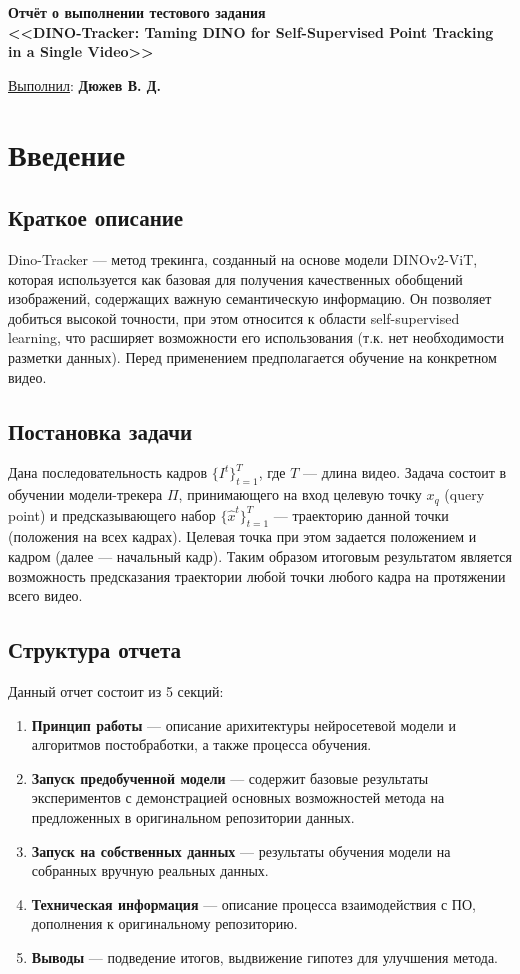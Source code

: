 \documentclass[a4paper, 14pt]{extarticle}
\theoremstyle{definition}
\theoremstyle{plain}
\theoremstyle{remark}
\newcommand*{\titlePage}{
	\thispagestyle{title}
	\begingroup
	\begin{center}
		\vspace*{3ex}
		{\small
		}
		
		\vspace*{2ex}
		
		{\normalsize
		}
		
		\vspace*{30ex}
		
		{\Large \bfseries 
			Отчёт о выполнении тестового задания\\
			{\large <<DINO-Tracker: Taming DINO for Self-Supervised
			Point Tracking in a Single Video>>\\
				}
			
		}
		
	\end{center}
	\vspace*{10ex}
	\begin{flushright}
		{\large 
			\underline{Выполнил}: \textbf{Дюжев В. Д.}
		}

	\end{flushright}	
	\newpage
	\setcounter{page}{1}
	\endgroup}
\begin{document}
\renewcommand{\contentsname}{\hfillОГЛАВЛЕНИЕ\hfill} 
\titlePage
\thispagestyle{plain}
\tableofcontents
\pagestyle{style}

\newpage
\setcounter{page}{1}


\section{Введение}
\subsection{Краткое описание}
Dino-Tracker --- метод трекинга, созданный на основе модели DINOv2-ViT, которая используется как базовая для получения качественных обобщений изображений, содержащих важную семантическую информацию. Он позволяет добиться высокой точности, при этом относится к области self-supervised learning, что расширяет возможности его использования (т.к. нет необходимости разметки данных). Перед применением предполагается обучение на конкретном видео.

\subsection{Постановка задачи}
Дана последовательность кадров $\{I^t\}^T_{t=1}$, где $T$ --- длина видео. Задача состоит в обучении модели-трекера $\Pi$, принимающего на вход целевую точку $x_q$ (query point) и предсказывающего набор $\{\hat{x}^t\}^T_{t=1}$ --- траекторию данной точки (положения на всех кадрах). Целевая точка при этом задается положением и кадром (далее --- начальный кадр).
Таким образом итоговым результатом является возможность предсказания траектории любой точки любого кадра на протяжении всего видео.

\subsection{Структура отчета}
Данный отчет состоит из 5 секций:
\begin{enumerate}
	\item \textbf{Принцип работы} --- описание арихитектуры нейросетевой модели и алгоритмов постобработки, а также процесса обучения.
	\item \textbf{Запуск предобученной модели} --- содержит базовые результаты экспериментов с демонстрацией основных возможностей метода на предложенных в оригинальном репозитории данных.
	\item \textbf{Запуск на собственных данных} --- результаты обучения модели на собранных вручную реальных данных.
	\item \textbf{Техническая информация} --- описание процесса взаимодействия с ПО, дополнения к оригинальному репозиторию.
	\item \textbf{Выводы} --- подведение итогов, выдвижение гипотез для улучшения метода.
\end{enumerate}
\end{document}
